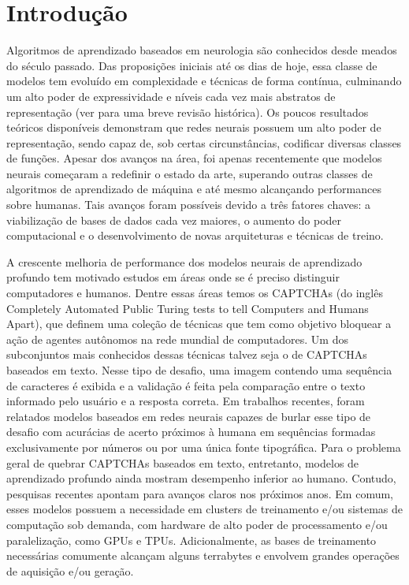 \chapter{Introdução}

Algoritmos de aprendizado baseados em neurologia são conhecidos desde meados do século passado\cite{perceptron_58}. Das proposições iniciais até os dias de hoje, essa classe de modelos tem evoluído em complexidade e técnicas de forma contínua,
culminando um alto poder de expressividade e níveis cada vez mais abstratos de representação (ver \cite{Goodfellow-et-al-2016} para uma breve revisão histórica). Os poucos resultados teóricos disponíveis demonstram que redes neurais possuem um alto poder de representação, sendo capaz de, sob certas circunstâncias, codificar diversas classes de funções\cite{Barron1993UniversalAB, Andoni2014PolyAprox}. 
Apesar dos avanços na área, foi apenas recentemente que modelos neurais 
começaram a redefinir o estado da arte, superando outras classes de algoritmos de aprendizado de máquina\cite{imagenet_2012}
e até mesmo alcançando performances sobre humanas\cite{mnih2015humanlevel}.
Tais avanços foram possíveis devido a três fatores chaves: a viabilização de bases de dados
cada vez maiores, o aumento do poder computacional e o desenvolvimento de novas arquiteturas e técnicas de treino.

A crescente melhoria de performance dos modelos neurais de aprendizado profundo tem motivado
estudos em áreas onde se é preciso distinguir computadores e humanos. Dentre essas áreas temos os CAPTCHAs \cite{captcha2003} (do inglês Completely Automated  Public  Turing  tests  to  tell  Computers  and Humans Apart), que definem uma coleção de técnicas que tem como objetivo bloquear a ação de agentes autônomos na rede mundial de computadores. Um dos subconjuntos mais conhecidos dessas técnicas talvez seja o de CAPTCHAs baseados em texto\cite{captcha_review_2017}. Nesse tipo de desafio, uma imagem contendo uma sequência de caracteres é exibida e a validação é feita pela comparação entre o texto informado pelo usuário e a resposta
correta. Em trabalhos recentes, foram relatados modelos baseados em redes neurais capazes de burlar esse tipo de desafio com acurácias de acerto próximos à humana em sequências formadas exclusivamente por números\cite{captcha_break_2013} ou por uma única fonte tipográfica\cite{captcha_break_2017}. Para o problema geral de quebrar CAPTCHAs baseados em texto, entretanto, modelos de aprendizado profundo ainda mostram desempenho inferior ao humano. Contudo, pesquisas recentes apontam para avanços claros nos próximos anos\cite{Bursztein2014TheEI}. Em comum, esses modelos possuem a  necessidade em clusters de treinamento e/ou sistemas de computação sob demanda, com hardware de alto poder de processamento e/ou paralelização, como GPUs e TPUs. Adicionalmente, as bases de treinamento necessárias comumente alcançam alguns terrabytes e envolvem grandes operações de aquisição e/ou geração.

